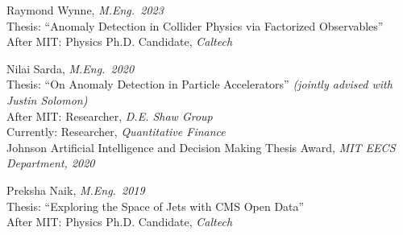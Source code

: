 \bbl

\item Raymond Wynne, \emph{M.Eng.~2023}
\\ Thesis: ``Anomaly Detection in Collider Physics via Factorized Observables''
\\ After MIT: Physics Ph.D. Candidate, \emph{Caltech}

\item Nilai Sarda, \emph{M.Eng.~2020}
\\ Thesis: ``On Anomaly Detection in Particle Accelerators'' \emph{(jointly advised with Justin Solomon)}
\\ After MIT: Researcher, \emph{D.E. Shaw Group}
\\ Currently: Researcher, \emph{Quantitative Finance}
\\ Johnson Artificial Intelligence and Decision Making Thesis Award, \emph{MIT EECS Department, 2020}

\item Preksha Naik, \emph{M.Eng.~2019}
\\ Thesis: ``Exploring the Space of Jets with CMS Open Data''
\\ After MIT: Physics Ph.D. Candidate, \emph{Caltech}

\el
